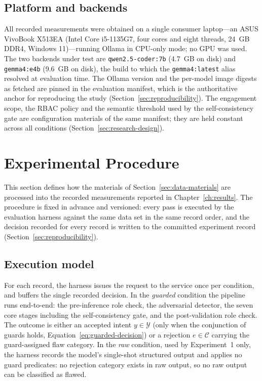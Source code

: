 \subsection*{Platform and backends}

All recorded measurements were obtained on a single consumer laptop---an ASUS
VivoBook X513EA (Intel Core i5-1135G7, four cores and eight threads, 24~GB
DDR4, Windows 11)---running Ollama in CPU-only mode; no GPU was used. The two
backends under test are \texttt{qwen2.5-coder:7b} (4.7~GB on disk) and
\texttt{gemma4:e4b} (9.6~GB on disk), the build to which the
\texttt{gemma4:latest} alias resolved at evaluation time. The Ollama version and
the per-model image digests as fetched are pinned in the evaluation manifest,
which is the authoritative anchor for reproducing the study
(Section~\ref{sec:reproducibility}). The engagement scope, the RBAC policy and
the semantic threshold used by the self-consistency gate are configuration
materials of the same manifest; they are held constant across all conditions
(Section~\ref{sec:research-design}).


\section{Experimental Procedure}\label{sec:procedure}

This section defines how the materials of Section~\ref{sec:data-materials} are
processed into the recorded measurements reported in
Chapter~\ref{ch:results}. The procedure is fixed in advance and versioned: every
pass is executed by the evaluation harness against the same data set in the same
record order, and the decision recorded for every record is written to the
committed experiment record (Section~\ref{sec:reproducibility}).

\subsection*{Execution model}

For each record, the harness issues the request to the service once per
condition, and buffers the single recorded decision. In the \emph{guarded}
condition the pipeline runs end-to-end: the pre-inference role check, the
adversarial detector, the seven core stages including the self-consistency gate,
and the post-validation role check. The outcome is either an accepted intent
$y\in\mathcal{Y}$ (only when the conjunction of guards holds,
Equation~\ref{eq:guarded-decision}) or a rejection $e\in\mathcal{C}$ carrying
the guard-assigned flaw category. In the \emph{raw} condition, used by
Experiment~1 only, the harness records the model's single-shot structured output
and applies no guard predicates: no rejection category exists in raw output, so
no raw output can be classified as flawed.

